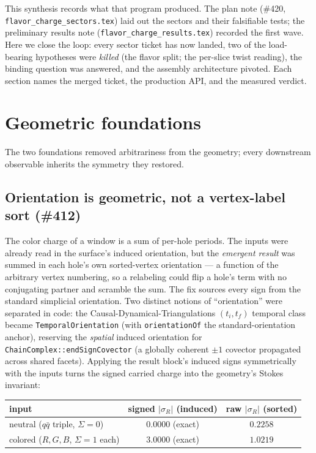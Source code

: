 \documentclass[11pt]{article}
\theoremstyle{definition}
\newcommand{\abs}[1]{\left\lvert #1 \right\rvert}
\newcommand{\sigmacol}{\sigma}
\newcommand{\code}[1]{\texttt{#1}}
\begin{document}
This synthesis records what that program produced. The plan note (\#420,
\code{flavor\allowbreak\_charge\allowbreak\_sectors.tex}) laid out the sectors and their
falsifiable tests; the preliminary results note
(\code{flavor\allowbreak\_charge\allowbreak\_results.tex}) recorded the first wave. Here
we close the loop: every sector ticket has now landed, two of the load-bearing hypotheses
were \emph{killed} (the flavor split; the per-slice twist reading), the binding question
was answered, and the assembly architecture pivoted. Each section names the merged ticket,
the production API, and the measured verdict.

\section{Geometric foundations}
\label{sec:foundations}

The two foundations removed arbitrariness from the geometry; every downstream observable
inherits the symmetry they restored.

\subsection{Orientation is geometric, not a vertex-label sort (\#412)}
\label{sec:orient}

The color charge of a window is a sum of per-hole periods. The inputs were already read
in the surface's induced orientation, but the \emph{emergent result} was summed in each
hole's own sorted-vertex orientation --- a function of the arbitrary vertex numbering, so
a relabeling could flip a hole's term with no conjugating partner and scramble the sum.
The fix sources every sign from the standard simplicial orientation. Two distinct notions
of ``orientation'' were separated in code: the Causal-Dynamical-Triangulations $(t_i,t_f)$
temporal class became \code{TemporalOrientation} (with \code{orientationOf} the
standard-orientation anchor), reserving the \emph{spatial} induced orientation for
\code{ChainComplex::endSignCovector} (a globally coherent $\pm1$ covector propagated
across shared facets). Applying the result block's induced signs symmetrically with the
inputs turns the signed carried charge into the geometry's Stokes invariant:

\begin{center}
\small
\begin{tabular}{@{}lcc@{}}
\toprule
input & signed $\abs{\sigmacol_R}$ (induced) & raw $\abs{\sigmacol_R}$ (sorted) \\
\midrule
neutral ($q\bar q$ triple, $\Sigma=0$) & $0.0000$ (exact) & $0.2258$\\
colored ($R,G,B$, $\Sigma=1$ each)     & $3.0000$ (exact) & $1.0219$\\
\bottomrule
\end{tabular}
\end{center}
\end{document}
